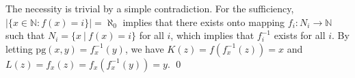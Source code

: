 
\begin{pf} \rm
 The necessity is trivial by a simple contradiction.
 For the sufficiency, $|\{x\in\mathbb{N} : f(x) = i\}|=\aleph_0$ implies that
 there exists onto mapping
 $f_i : N_i\to \mathbb{N}$ such that $N_i = \{x~ | ~f(x) = i\}$ for all $i$,
 which implies that $f_i^{-1}$ exists for all $i$.
 By letting $\mathrm{pg}(x, y) = f_x^{-1}(y)$,
 we have $K(z) = f(f_x^{-1}(z)) = x$ and $L(z) 
 = f_x(z) = f_x( f_x^{-1}(y) ) = y$. \qed

\end{pf}
